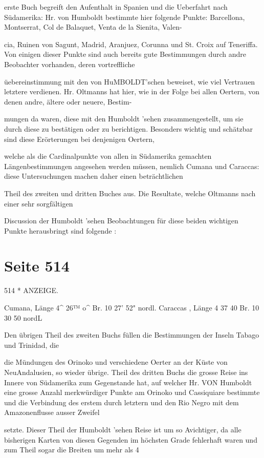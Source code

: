 \documentclass[10pt,a4paper]{article}
\begin{document}
erste Buch begreift den Aufenthalt in Spanien und die Ueberfahrt nach Südamerika: Hr. von Humboldt bestimmte hier folgende Punkte: Barcellona, Montserrat, Col de Balaquet, Venta de la Sienita, Valen-

cia, Ruinen von Sagunt, Madrid, Aranjuez, Corunna und St. Croix auf Teneriffa. Von einigen dieser Punkte sind auch bereits gute Bestimmungen durch andre Beobachter vorhanden, deren vortreffliche

üebereinstimmung mit den von HuMBOLDT'schen beweiset, wie viel Vertrauen letztere verdienen. Hr. Oltmanns hat hier, wie in der Folge bei allen Oertern, von denen andre, ältere oder neuere, Bestim-

mungen da waren, diese mit den Humboldt 'sehen zusammengestellt, um sie durch diese zu bestätigen oder zu berichtigen. Besonders wichtig und schätzbar sind diese Erörterungen bei denjenigen Oertern,

welche als die Cardinalpunkte von allen in Südamerika gemachten Längenbestimmungen angesehen werden müssen, nemlich Cumana und Caraccas: diese Untersuchungen machen daher einen beträchtlichen

Theil des zweiten und dritten Buches aus. Die Resultate, welche Oltmanns nach einer sehr sorgfältigen

Discussion der Humboldt 'sehen Beobachtungen für diese beiden wichtigen Punkte herausbringt sind folgende :


\newpage
\section*{Seite 514}
514 * ANZEIGE.

Cumana, Länge 4\textasciicircum{} 26™ o\textasciicircum{} Br. 10\textdegree{} 27' 52" nordl. Caraccas , Länge 4 37 40 Br. 10 30 50 nordL

Den übrigen Theil des zweiten Buchs füllen die Bestimmungen der Inseln Tabago und Trinidad, die

die Mündungen des Orinoko und verschiedene Oerter an der Küste von NeuAndalusien, so wieder übrige. Theil des dritten Buchs die grosse Reise ins Innere von Südamerika zum Gegenstande hat, auf welcher Hr. VON Humboldt eine grosse Anzahl merkwürdiger Punkte am Orinoko und Cassiquiare bestimmte und die Verbindung des erstem durch letztern und den Rio Negro mit dem Amazonenflusse ausser Zweifel

setzte. Dieser Theil der Humboldt 'sehen Reise ist um so Avichtiger, da alle bisherigen Karten von diesen Gegenden im höchsten Grade fehlerhaft waren und zum Theil sogar die Breiten um mehr als 4
\end{document}
